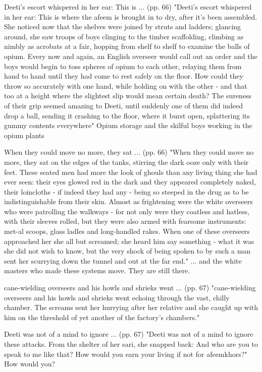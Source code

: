 Deeti’s escort whispered in her ear: This is ... (pp. 66)
"Deeti’s escort whispered in her ear: This is where the afeem is brought in to dry, after it’s been assembled. She noticed now that the shelves were joined by struts and ladders; glancing around, she saw troops of boys clinging to the timber scaffolding, climbing as nimbly as acrobats at a fair, hopping from shelf to shelf to examine the balls of opium. Every now and again, an English overseer would call out an order and the boys would begin to toss spheres of opium to each other, relaying them from hand to hand until they had come to rest safely on the floor. How could they throw so accurately with one hand, while holding on with the other - and that too at a height where the slightest slip would mean certain death? The sureness of their grip seemed amazing to Deeti, until suddenly one of them did indeed drop a ball, sending it crashing to the floor, where it burst open, splattering its gummy contents everywhere"
Opium storage and the skilful boys working in the opium plants

When they could move no more, they sat ... (pp. 66)
"When they could move no more, they sat on the edges of the tanks, stirring the dark ooze only with their feet. These seated men had more the look of ghouls than any living thing she had ever seen: their eyes glowed red in the dark and they appeared completely naked, their loincloths - if indeed they had any - being so steeped in the drug as to be indistinguishable from their skin. Almost as frightening were the white overseers who were patrolling the walkways - for not only were they coatless and hatless, with their sleeves rolled, but they were also armed with fearsome instruments: met-al scoops, glass ladles and long-handled rakes. When one of these overseers approached her she all but screamed; she heard him say something - what it was she did not wish to know, but the very shock of being spoken to by such a man sent her scurrying down the tunnel and out at the far end."
... and the white masters who made these systems move. They are still there.

cane-wielding overseers and his howls and shrieks went ... (pp. 67)
"cane-wielding overseers and his howls and shrieks went echoing through the vast, chilly chamber. The screams sent her hurrying after her relative and she caught up with him on the threshold of yet another of the factory’s chambers."

Deeti was not of a mind to ignore ... (pp. 67)
"Deeti was not of a mind to ignore these attacks. From the shelter of her sari, she snapped back: And who are you to speak to me like that? How would you earn your living if not for afeemkhors?"
How would you?

